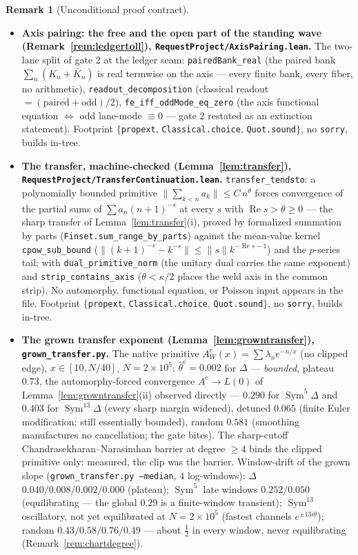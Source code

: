 \documentclass[11pt]{article}
\theoremstyle{definition}
\newtheorem{remark}[theorem]{Remark}
\renewcommand{\Re}{\operatorname{Re}}
\newcommand{\Sym}{\operatorname{Sym}}
\begin{document}
\begin{remark}[Unconditional proof contract]
\begin{enumerate}
\begin{itemize}
\item \textbf{Axis pairing: the free and the open part of the standing wave
(Remark~\ref{rem:ledgertoll}), \texttt{RequestProject/AxisPairing.lean}.} The two-lane split of gate 2 at
the ledger seam: \texttt{pairedBank\_real} (the paired bank $\sum_n(K_n+\bar K_n)$ is real termwise on the
axis --- every finite bank, every fiber, no arithmetic), \texttt{readout\_decomposition} (classical readout
$=(\text{paired}+\text{odd})/2$), \texttt{fe\_iff\_oddMode\_eq\_zero} (the axis functional equation
$\Leftrightarrow$ odd lane-mode $\equiv0$ --- gate 2 restated as an extinction statement). Footprint
$\{$\texttt{propext}, \texttt{Classical.choice}, \texttt{Quot.sound}$\}$, no \texttt{sorry}, builds in-tree.

\item \textbf{The transfer, machine-checked (Lemma~\ref{lem:transfer}),
\texttt{RequestProject/TransferContinuation.lean}.} \texttt{transfer\_tendsto}: a polynomially
bounded primitive $\|\sum_{k<n}a_k\|\le C\,n^{\theta}$ forces convergence of the partial sums of
$\sum a_n(n{+}1)^{-s}$ at every $s$ with $\Re s>\theta\ge0$ --- the sharp transfer of
Lemma~\ref{lem:transfer}(i), proved by formalized summation by parts
(\texttt{Finset.sum\_range\_by\_parts}) against the mean-value kernel \texttt{cpow\_sub\_bound}
($\|(k{+}1)^{-s}-k^{-s}\|\le\|s\|k^{-\Re s-1}$) and the $p$-series tail; with
\texttt{dual\_primitive\_norm} (the unitary dual carries the same exponent) and
\texttt{strip\_contains\_axis} ($\theta<\kappa/2$ places the weld axis in the common strip).
No automorphy, functional equation, or Poisson input appears in the file. Footprint
$\{$\texttt{propext}, \texttt{Classical.choice}, \texttt{Quot.sound}$\}$, no \texttt{sorry},
builds in-tree.

\item \textbf{The grown transfer exponent (Lemma~\ref{lem:growntransfer}), \texttt{grown\_transfer.py}.}
The native primitive $A^{\mathrm e}_W(x)=\sum\lambda_n e^{-n/x}$ (no clipped edge), $x\in[10,N/40]$,
$N=2\times10^{5}$: $\hat\theta^{\mathrm e}=0.002$ for $\Delta$ --- \emph{bounded}, plateau $0.73$, the
automorphy-forced convergence $A^{\mathrm e}\to L(0)$ of Lemma~\ref{lem:growntransfer}(ii) observed directly
--- $0.290$ for $\Sym^5\Delta$ and $0.403$ for $\Sym^{13}\Delta$ (every sharp margin widened), detuned
$0.065$ (finite Euler modification: still essentially bounded), random $0.581$ (smoothing manufactures no
cancellation; the gate bites). The sharp-cutoff Chandrasekharan--Narasimhan barrier at degree $\ge4$ binds
the clipped primitive only: measured, the clip was the barrier. Window-drift of the grown slope
(\texttt{grown\_transfer.py --median}, $4$ log-windows): $\Delta$ $0.040/0.008/0.002/0.000$ (plateau);
$\Sym^5$ late windows $0.252/0.050$ (equilibrating --- the global $0.29$ is a finite-window transient);
$\Sym^{13}$ oscillatory, not yet equilibrated at $N=2\times10^{5}$ (fastest channels $e^{\pm13i\theta}$);
random $0.43/0.58/0.76/0.49$ --- about $\tfrac12$ in every window, never equilibrating
(Remark~\ref{rem:chartdegree}).


\end{itemize}
\end{enumerate}
\end{remark}
\end{document}
